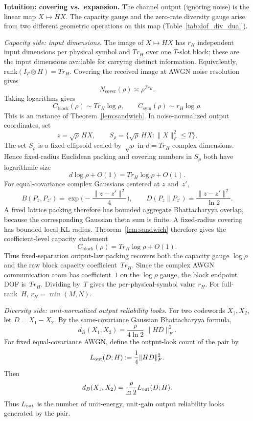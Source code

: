 \documentclass[lettersize,onecolumn]{IEEEtran}
\newcommand{\snr}{\rho}
\begin{document}
\textbf{Intuition: covering vs.\ expansion.}
The channel output (ignoring noise) is the linear map $X \mapsto HX$.
The capacity gauge and the zero-rate diversity gauge arise from two
different geometric operations on this map
(Table~\ref{tab:dof_div_dual}).

\emph{Capacity side: input dimensions.}
The image of $X \mapsto HX$ has $r_H$ independent input dimensions
per physical symbol and $Tr_H$ over one $T$-slot block; these are the
input dimensions available for carrying distinct information.
Equivalently,
$\mathrm{rank}(I_T \otimes H) = Tr_H$.
Covering the received image at AWGN noise resolution gives
\begin{equation}\label{eq:det_dof}
N_{\mathrm{cover}}(\snr) \asymp \snr^{Tr_H}.
\end{equation}
Taking logarithms gives
\begin{equation}\label{eq:dof_capacity}
C_{\mathrm{block}}(\snr) \sim Tr_H\log\snr, \qquad
C_{\mathrm{sym}}(\snr) \sim r_H\log\snr.
\end{equation}
This is an instance of Theorem~\ref{lem:sandwich}. In noise-normalized
output coordinates, set
\[
z = \sqrt{\snr}\,HX,\qquad
S_\snr = \{\sqrt{\snr}\,HX : \|X\|_F^2 \le T\}.
\]
The set $S_\snr$ is a fixed ellipsoid scaled by~$\sqrt{\snr}$ in
$d = Tr_H$ complex dimensions. Hence fixed-radius Euclidean packing
and covering numbers in $S_\snr$ both have logarithmic size
\[
d\log\snr + O(1) = Tr_H\log\snr + O(1).
\]
For equal-covariance complex Gaussians centered at $z$ and~$z'$,
\[
B(P_z, P_{z'}) = \exp\!\Big(-\frac{\|z - z'\|^2}{4}\Big),
\qquad
D(P_z \| P_{z'}) = \frac{\|z - z'\|^2}{\ln 2}.
\]
A fixed lattice packing therefore has bounded aggregate Bhattacharyya
overlap, because the corresponding Gaussian theta sum is finite.
A fixed-radius covering has bounded local KL radius.
Theorem~\ref{lem:sandwich} therefore gives the coefficient-level
capacity statement
\[
C_{\mathrm{block}}(\snr) = Tr_H\log\snr + O(1).
\]
Thus fixed-separation output-law packing recovers both the capacity
gauge $\log\snr$ and the raw block capacity coefficient~$Tr_H$.
Since the complex AWGN communication atom has coefficient~$1$ on the
$\log\snr$ gauge, the block endpoint DOF is~$Tr_H$.
Dividing by~$T$ gives the
per-physical-symbol value $r_H$.
For full-rank~$H$, $r_H = \min(M,N)$.

\emph{Diversity side: unit-normalized output reliability looks.}
For two codewords $X_1, X_2$, let $D = X_1 - X_2$. By the
same-covariance Gaussian Bhattacharyya formula,
\begin{equation}\label{eq:det_div}
d_B(X_1, X_2) = \frac{\snr}{4\ln 2}\,\|HD\|_F^2.
\end{equation}
For fixed equal-covariance AWGN, define the output-look count of the
pair by
\[
L_{\rm out}(D;H):=\frac14\|HD\|_F^2.
\]
Then
\[
d_B(X_1,X_2)=\frac{\snr}{\ln 2}L_{\rm out}(D;H).
\]
Thus $L_{\rm out}$ is the number of unit-energy, unit-gain output
reliability looks generated by the pair.
\end{document}
